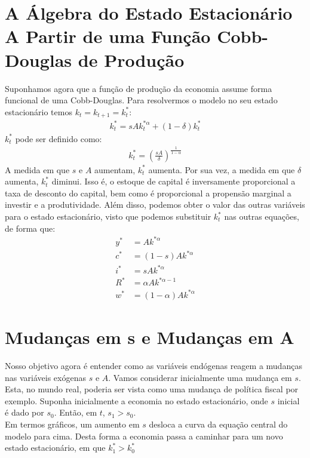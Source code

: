 \documentclass[11pt,a4paper]{article}
\begin{document}
\section{A Álgebra do Estado Estacionário A Partir de uma Função Cobb-Douglas de Produção}
Suponhamos agora que a função de produção da economia assume forma funcional de uma Cobb-Douglas. Para resolvermos o modelo no seu estado estacionário temos $k_t = k_{t+1} = k_t ^{\ast}$:
\begin{align}
k_t ^{\ast} = sAk_t ^{\ast \alpha} + (1-\delta)k_t ^{\ast}
\end{align}
\noindent
$k_t ^{\ast}$ pode ser definido como:
\begin{align}
k_t ^{\ast} = \left(\frac{sA}{\delta}\right)^{\frac{1}{1-\alpha}}
\end{align}
A medida em que $s$ e $A$ aumentam, $k_t ^{\ast}$ aumenta. Por sua vez, a medida em que $\delta$ aumenta, $k_t ^{\ast}$ diminui. Isso é, o estoque de capital é inversamente proporcional a taxa de desconto do capital, bem como é proporcional a propensão marginal a investir e a produtividade. Além disso, podemos obter o valor das outras variáveis para o estado estacionário, visto que podemos substituir $k_t ^{\ast}$ nas outras equações, de forma que:
\begin{align}
y^{\ast} &= Ak^{\ast \alpha} \\
c^{\ast} &= (1-s)Ak^{\ast \alpha}\\
i^{\ast} &= sAk^{\ast \alpha} \\
R^{\ast} &= \alpha A k^{\ast \alpha - 1}\\
w^{\ast} &= (1-\alpha)Ak^{\ast \alpha}  
\end{align}
\section{Mudanças em s e Mudanças em A}

Nosso objetivo agora é entender como as variáveis endógenas reagem a mudanças nas variáveis exógenas $s$ e $A$. Vamos considerar inicialmente uma mudança em $s$. Esta, no mundo real, poderia ser vista como uma mudança de política fiscal por exemplo. Suponha inicialmente a economia no estado estacionário, onde $s$ inicial é dado por $s_0$. Então, em $t$, $s_1 > s_0$.\\

Em termos gráficos, um aumento em $s$ desloca a curva da equação central do modelo para cima. Desta forma a economia passa a caminhar para um novo estado estacionário, em que $k_1^{\ast} > k_0^{\ast}$  
\end{document}
